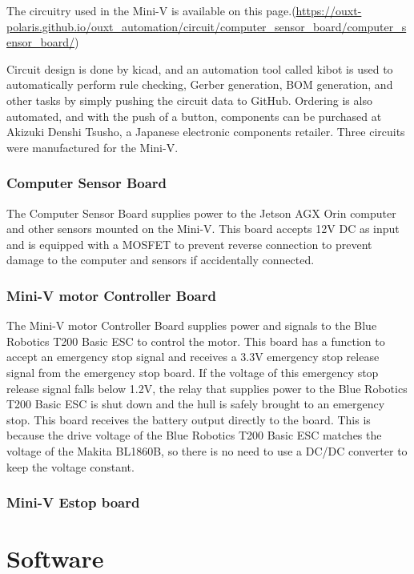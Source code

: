 \documentclass[lettersize,journal]{IEEEtran}
\begin{document}
The circuitry used in the Mini-V is available on this page.(\url{https://ouxt-polaris.github.io/ouxt_automation/circuit/computer_sensor_board/computer_sensor_board/})

Circuit design is done by kicad, and an automation tool called kibot is used to automatically perform rule checking, Gerber generation, BOM generation, and other tasks by simply pushing the circuit data to GitHub.
Ordering is also automated, and with the push of a button, components can be purchased at Akizuki Denshi Tsusho, a Japanese electronic components retailer.
Three circuits were manufactured for the Mini-V.

\subsubsection{Computer Sensor Board}

The Computer Sensor Board supplies power to the Jetson AGX Orin computer and other sensors mounted on the Mini-V.
This board accepts 12V DC as input and is equipped with a MOSFET to prevent reverse connection to prevent damage to the computer and sensors if accidentally connected.

\subsubsection{Mini-V motor Controller Board}

The Mini-V motor Controller Board supplies power and signals to the Blue Robotics T200 Basic ESC to control the motor.
This board has a function to accept an emergency stop signal and receives a 3.3V emergency stop release signal from the emergency stop board.
If the voltage of this emergency stop release signal falls below 1.2V, the relay that supplies power to the Blue Robotics T200 Basic ESC is shut down and the hull is safely brought to an emergency stop.
This board receives the battery output directly to the board.
This is because the drive voltage of the Blue Robotics T200 Basic ESC matches the voltage of the Makita BL1860B, so there is no need to use a DC/DC converter to keep the voltage constant.

\subsubsection{Mini-V Estop board}

\section{Software}
\end{document}
